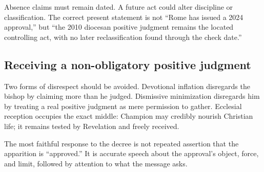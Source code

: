 Absence claims must remain dated. A future act could alter discipline or classification. The correct present statement is not “Rome has issued a 2024 approval,” but “the 2010 diocesan positive judgment remains the located controlling act, with no later reclassification found through the check date.”

\subsection{Receiving a non-obligatory positive judgment}

Two forms of disrespect should be avoided. Devotional inflation disregards the bishop by claiming more than he judged. Dismissive minimization disregards him by treating a real positive judgment as mere permission to gather. Ecclesial reception occupies the exact middle: Champion may credibly nourish Christian life; it remains tested by Revelation and freely received.

The most faithful response to the decree is not repeated assertion that the apparition is “approved.” It is accurate speech about the approval's object, force, and limit, followed by attention to what the message asks.
